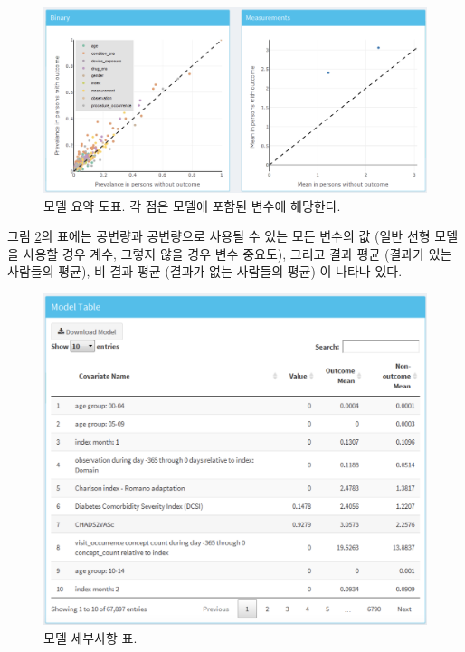 \documentclass[10.5pt]{book}
\theoremstyle{definition}
\theoremstyle{definition}
\theoremstyle{definition}
\theoremstyle{remark}
\begin{document}
\begin{figure}

{\centering \includegraphics[width=1\linewidth]{images/PatientLevelPrediction/shiny/shinyModelPlots} 

}

\caption{모델 요약 도표. 각 점은 모델에 포함된 변수에 해당한다.}\label{fig:shinyModelPlots}
\end{figure}

그림 \ref{fig:shinyModelTable}의 표에는 공변량과 공변량으로 사용될 수
있는 모든 변수의 값 (일반 선형 모델을 사용할 경우 계수, 그렇지 않을 경우
변수 중요도), 그리고 결과 평균 (결과가 있는 사람들의 평균), 비-결과 평균
(결과가 없는 사람들의 평균) 이 나타나 있다.

\begin{figure}

{\centering \includegraphics[width=1\linewidth]{images/PatientLevelPrediction/shiny/shinyModelTable} 

}

\caption{모델 세부사항 표.}\label{fig:shinyModelTable}
\end{figure}
\end{document}
